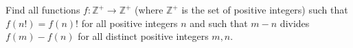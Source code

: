 Find all functions $f:\mathbb{Z}^+ \rightarrow \mathbb{Z}^+$ (where $\mathbb{Z}^+$ is the set of positive integers) such that $f(n!) = f(n)!$ for all positive integers $n$ and such that $m-n$ divides $f(m) - f(n)$ for all distinct positive integers $m, n$.